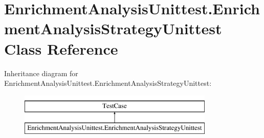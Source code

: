 \hypertarget{classEnrichmentAnalysisUnittest_1_1EnrichmentAnalysisStrategyUnittest}{\section{Enrichment\-Analysis\-Unittest.\-Enrichment\-Analysis\-Strategy\-Unittest Class Reference}
\label{classEnrichmentAnalysisUnittest_1_1EnrichmentAnalysisStrategyUnittest}
}
Inheritance diagram for Enrichment\-Analysis\-Unittest.\-Enrichment\-Analysis\-Strategy\-Unittest\-:\begin{figure}[H]
\begin{center}
\leavevmode
\includegraphics[height=2.000000cm]{classEnrichmentAnalysisUnittest_1_1EnrichmentAnalysisStrategyUnittest}
\end{center}
\end{figure}
